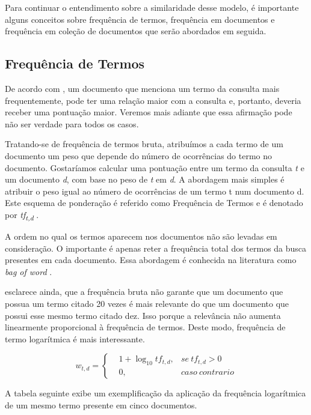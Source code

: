 Para continuar o entendimento sobre a similaridade desse modelo, é importante alguns conceitos sobre frequência de termos, frequência em documentos e frequência em coleção de documentos que serão abordados em seguida.

\subsection{Frequência de Termos}

De acordo com \cite{Manning2008}, um documento que menciona um termo da consulta mais frequentemente, pode ter uma relação maior com a consulta e, portanto, deveria receber uma pontuação maior. Veremos mais adiante que essa afirmação pode não ser verdade para todos os casos.

Tratando-se de frequência de termos bruta, atribuímos a cada termo de um documento um peso que depende do número de ocorrências do termo no documento. Gostaríamos calcular uma pontuação entre um termo da consulta \textit{t} e um documento \textit{d}, com base no peso de \textit{t} em \textit{d}. A abordagem mais simples é atribuir o peso igual ao número de ocorrências de um termo t num documento d. Este esquema de ponderação é referido como Frequência de Termos e é denotado por \textit{tf\textsubscript{t,d}} \citep{Manning2008}.

A ordem no qual os termos aparecem nos documentos não são levadas em consideração. O importante é apenas reter a frequência total dos termos da busca presentes em cada documento. Essa abordagem é conhecida na literatura como \textit{bag of word} \citep{Croft2010}.

\cite{Manning2008} esclarece ainda, que a frequência bruta não garante que um documento que possua um termo citado 20 vezes é mais relevante do que um documento que possui esse mesmo termo citado dez. Isso porque a relevância não aumenta linearmente proporcional à frequência de termos. Deste modo, frequência de termo logarítmica é mais interessante.

\begin{equation}
w_{t,d} = 
\left\{\begin{matrix}
 &1 +  \log_{10}tf_{t,d},  &se\ tf_{t,d} > 0 \\ 
 &0,  &caso\ contrario 
\end{matrix}\right.
\label{eq:log-tf}
\end{equation}

A tabela seguinte exibe um exemplificação da aplicação da frequência logarítmica de um mesmo termo presente em cinco documentos.


